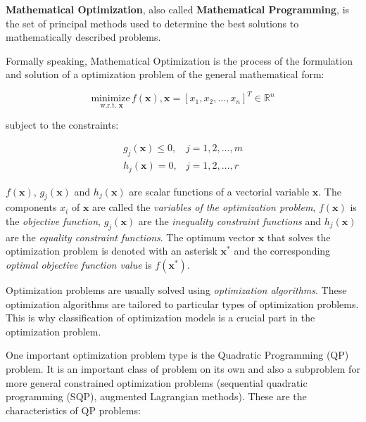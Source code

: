 \textbf{Mathematical Optimization}, also called \textbf{Mathematical Programming}, is the set of principal methods used to determine the best solutions to mathematically described problems.

Formally speaking, Mathematical Optimization is the process of the formulation and solution of a optimization problem of the general mathematical form:

$$
\underset{\text { w.r.t. } \mathbf{x}}{\text{minimize}} \, f(\mathbf{x}), \mathbf{x}=\left[x_{1}, x_{2}, \ldots, x_{n}\right]^{T} \in \mathbb{R}^{n}
$$

subject  to  the  constraints:

$$
\begin{array}{ll}
    g_{j}(\mathbf{x}) \leq 0, & j=1,2, \ldots, m \\
    h_{j}(\mathbf{x})=0, & j=1,2, \ldots, r
\end{array}
$$

$f(\mathbf{x})$, $g_{j}(\mathbf{x})$ and $h_{j}(\mathbf{x})$ are scalar functions of a vectorial variable $\mathbf{x}$. The components $x_i$ of $\mathbf{x}$ are called the \textit{variables of the optimization problem}, $f(\mathbf{x})$ is the \textit{objective function}, $g_{j}(\mathbf{x})$ are the \textit{inequality constraint functions} and $h_{j}(\mathbf{x})$ are the \textit{equality constraint functions}. The optimum vector $\mathbf{x}$ that solves the optimization problem is denoted with an asterisk $\mathbf{x^{*}}$ and the corresponding \textit{optimal objective function value }is $f(\mathbf{x^{*}})$.

Optimization problems are usually solved using \textit{optimization algorithms}. These optimization algorithms are tailored to particular types of optimization problems. This is why classification of optimization models is a crucial part in the optimization problem.

One important optimization problem type is the Quadratic Programming (QP) problem. It is an important class of problem on its own and also a subproblem for more general constrained optimization problems (sequential quadratic programming (SQP), augmented Lagrangian methods). These are the characteristics of QP problems:

